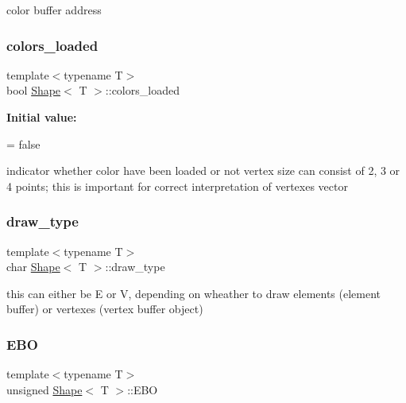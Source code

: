 color buffer address \mbox{\label{classShape_a216866713d16c882a0f0b0b0a89d350d}} 
\subsubsection{\texorpdfstring{colors\+\_\+loaded}{colors\_loaded}}
{\footnotesize\ttfamily template$<$typename T$>$ \\
bool \mbox{\hyperlink{classShape}{Shape}}$<$ T $>$\+::colors\+\_\+loaded\hspace{0.3cm}{\ttfamily [protected]}}

{\bfseries Initial value\+:}
\begin{DoxyCode}
=
        \textcolor{keyword}{false}
\end{DoxyCode}
indicator whether color have been loaded or not vertex size can consist of 2, 3 or 4 points; this is important for correct interpretation of vertexes vector \mbox{\label{classShape_a851fcb33238286342f670d27443ffdfc}} 
\subsubsection{\texorpdfstring{draw\+\_\+type}{draw\_type}}
{\footnotesize\ttfamily template$<$typename T$>$ \\
char \mbox{\hyperlink{classShape}{Shape}}$<$ T $>$\+::draw\+\_\+type\hspace{0.3cm}{\ttfamily [protected]}}

this can either be \textquotesingle{}E\textquotesingle{} or \textquotesingle{}V\textquotesingle{}, depending on wheather to draw elements (element buffer) or vertexes (vertex buffer object) \mbox{\label{classShape_a95c775e548b129e23d2dd32e23fb0f3e}} 
\subsubsection{\texorpdfstring{E\+BO}{EBO}}
{\footnotesize\ttfamily template$<$typename T$>$ \\
unsigned \mbox{\hyperlink{classShape}{Shape}}$<$ T $>$\+::E\+BO\hspace{0.3cm}{\ttfamily [protected]}}

